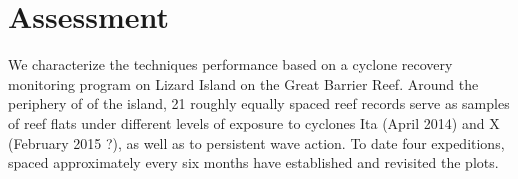 \section{Assessment}

We characterize the techniques performance based on a cyclone recovery monitoring program on Lizard Island on the Great Barrier Reef. Around the periphery of of the island, 21 roughly equally spaced reef records serve as samples of reef flats under different levels of exposure to cyclones Ita (April 2014) and X (February 2015 ?), as well as to persistent wave action.  To date four expeditions, spaced approximately every six months have established and revisited the plots.
